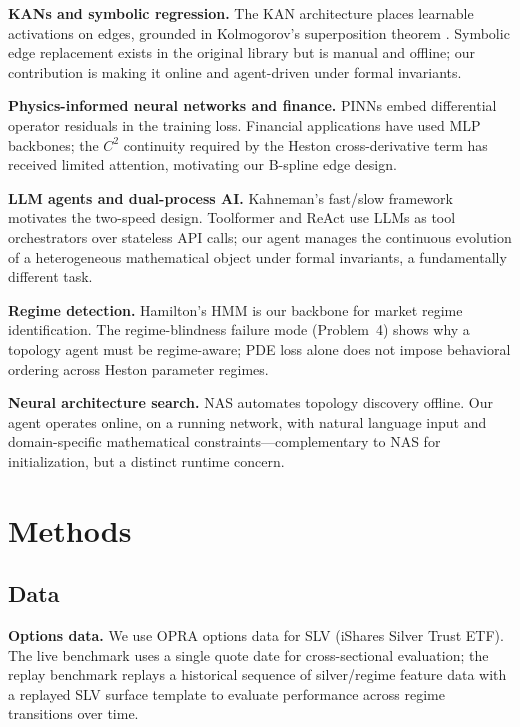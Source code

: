 \documentclass[11pt,a4paper]{article}
\begin{document}
\textbf{KANs and symbolic regression.}
The KAN architecture \citep{liu_etal_2024_kan} places learnable activations on edges,
grounded in Kolmogorov's superposition theorem \citep{kolmogorov1957representation}.
Symbolic edge replacement exists in the original library but is manual and offline;
our contribution is making it online and agent-driven under formal invariants.

\textbf{Physics-informed neural networks and finance.}
PINNs \citep{raissi2019physics} embed differential operator residuals in the training
loss. Financial applications \citep{horvath2021deep} have used MLP backbones; the
$C^2$ continuity required by the Heston cross-derivative term has received limited
attention, motivating our B-spline edge design.

\textbf{LLM agents and dual-process AI.}
Kahneman's fast/slow framework \citep{kahneman2011thinking} motivates the two-speed
design. Toolformer \citep{schick_etal_2023_toolformer} and ReAct \citep{yao_etal_2023_react}
use LLMs as tool orchestrators over stateless API calls; our agent manages the
continuous evolution of a heterogeneous mathematical object under formal invariants,
a fundamentally different task.

\textbf{Regime detection.}
Hamilton's HMM \citep{hamilton1989new} is our backbone for market regime identification.
The regime-blindness failure mode (Problem~4) shows why a topology agent must be
regime-aware; PDE loss alone does not impose behavioral ordering across Heston parameter
regimes.

\textbf{Neural architecture search.}
NAS \citep{elsken2019neural} automates topology discovery offline. Our agent operates
online, on a running network, with natural language input and domain-specific mathematical
constraints---complementary to NAS for initialization, but a distinct runtime concern.

\section{Methods}
\label{sec:methods}

\subsection{Data}

\textbf{Options data.} We use OPRA options data for SLV (iShares Silver Trust ETF).
The live benchmark uses a single quote date for cross-sectional evaluation; the replay
benchmark replays a historical sequence of silver/regime feature data with a replayed
SLV surface template to evaluate performance across regime transitions over time.
\end{document}
